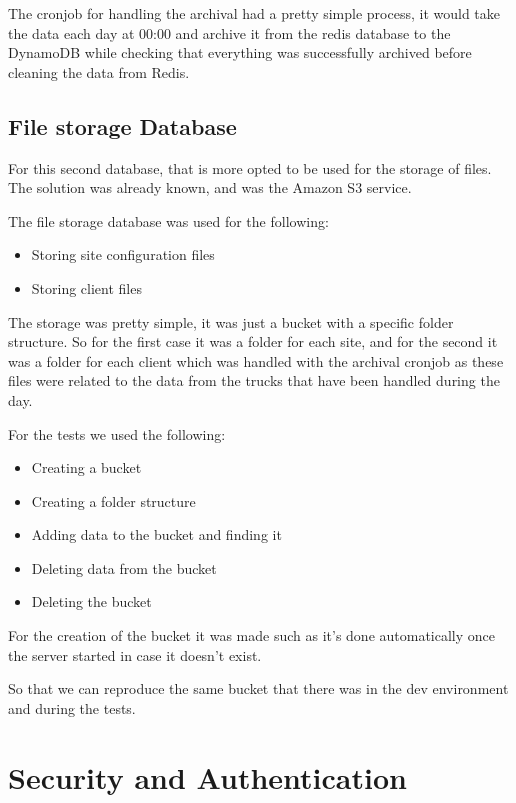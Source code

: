 The cronjob for handling the archival had a pretty simple process, 
it would take the data each day at 00:00 and archive it from the redis
database to the DynamoDB while checking that everything was successfully archived
before cleaning the data from Redis.

\subsection {File storage Database}

For this second database, that is more opted to be used for the storage of files.
The solution was already known, and was the Amazon S3 service.

The file storage database was used for the following:

    \begin{itemize}
        \item Storing site configuration files
        \item Storing client files
    \end{itemize}

The storage was pretty simple, it was just a bucket with a specific folder structure.
So for the first case it was a folder for each site,
and for the second it was a folder for each client which was handled with the archival
cronjob as these files were related to the data from the trucks that have been handled
during the day.

For the tests we used the following:

    \begin{itemize}
        \item Creating a bucket
        \item Creating a folder structure
        \item Adding data to the bucket and finding it
        \item Deleting data from the bucket
        \item Deleting the bucket
    \end{itemize}

For the creation of the bucket it was made such as it's done automatically once the
server started in case it doesn't exist.

So that we can reproduce the same bucket that there was in the dev environment and during
the  tests.

\section {Security and Authentication}

